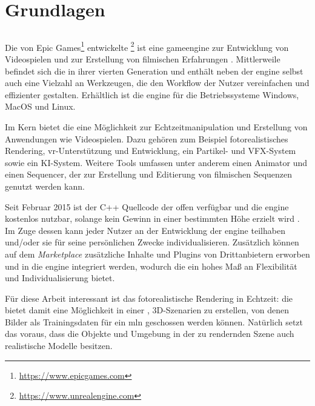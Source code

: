 \graphicspath{{./images/}}      
\def\CHAPTERONE{./chapters/Chapter-1} 

\chapter{Grundlagen}
\label{chap:software}
%	
\glsresetall
\section{\unreal}
\label{sec:unrealengine}
Die von Epic Games\footnote{\url{https://www.epicgames.com}} entwickelte \unreal\footnote{\url{https://www.unrealengine.com}} ist eine \gls{gameengine} zur Entwicklung von Videospielen und zur Erstellung von filmischen Erfahrungen \cite{featUnreal}. Mittlerweile befindet sich die \unreal in ihrer vierten Generation und enthält neben der \acrshort{engine} selbst auch eine Vielzahl an Werkzeugen, die den Workflow der Nutzer vereinfachen und effizienter gestalten. Erhältlich ist die \acrshort{engine} für die Betriebssysteme Windows, MacOS und Linux. \par

Im Kern bietet die \unreal eine Möglichkeit zur Echtzeitmanipulation und Erstellung von Anwendungen wie Videospielen. Dazu gehören zum Beispiel fotorealistisches Rendering, \gls{vr}-Unterstützung und Entwicklung, ein Partikel- und VFX-System sowie ein KI-System. Weitere Tools umfassen unter anderem einen Animator und einen Sequencer, der zur Erstellung und Editierung von filmischen Sequenzen genutzt werden kann. \par 

Seit Februar 2015 ist der C++ Quellcode der \unreal offen verfügbar und die \acrshort{engine} kostenlos nutzbar, solange kein Gewinn in einer bestimmten Höhe erzielt wird \cite{freeUnreal}. Im Zuge dessen kann jeder Nutzer an der Entwicklung der \acrshort{engine} teilhaben und/oder sie für seine persönlichen Zwecke individualisieren. Zusätzlich können auf dem \textit{Marketplace} zusätzliche Inhalte und Plugins von Drittanbietern erworben und in die \acrshort{engine} integriert werden, wodurch die \unreal ein hohes Maß an Flexibilität und Individualisierung bietet. \par 

Für diese Arbeit interessant ist das fotorealistische Rendering in Echtzeit: die \unreal bietet damit eine Möglichkeit in einer , 3D-Szenarien zu erstellen, von denen Bilder als Trainingsdaten für ein \gls{mln} geschossen werden können. Natürlich setzt das voraus, dass die Objekte und Umgebung in der zu rendernden Szene auch realistische Modelle besitzen.     


